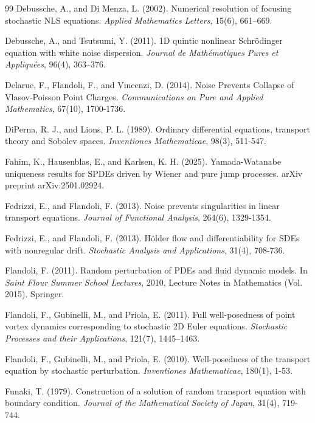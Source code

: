 \documentclass[12pt,oneside, reqno]{amsart}
\numberwithin{equation}{section}
\begin{document}
\begin{thebibliography}{99}
	 Debussche, A., and Di Menza, L. (2002). Numerical resolution of focusing stochastic NLS equations. {\it Applied Mathematics Letters}, 15(6), 661–669.
	
	 Debussche, A., and Tsutsumi, Y. (2011). 1D quintic nonlinear Schr\"{o}dinger equation with white noise dispersion. {\it Journal de Mathématiques Pures et Appliqu\'{e}es}, 96(4), 363–376.
	
	 Delarue, F., Flandoli, F., and Vincenzi, D. (2014). Noise Prevents Collapse of Vlasov‐Poisson Point Charges. {\it Communications on Pure and Applied Mathematics}, 67(10), 1700-1736.
	
	 DiPerna, R. J., and Lions, P. L. (1989). Ordinary differential equations, transport theory and Sobolev spaces. {\it Inventiones Mathematicae}, 98(3), 511-547.
	
	 Fahim, K., Hausenblas, E., and Karlsen, K. H. (2025). Yamada-Watanabe uniqueness results for SPDEs driven by Wiener and pure jump processes. arXiv preprint arXiv:2501.02924.
	
	 Fedrizzi, E., and Flandoli, F. (2013). Noise prevents singularities in linear transport equations. {\it Journal of Functional Analysis}, 264(6), 1329-1354.
	
	 Fedrizzi, E., and Flandoli, F. (2013). H\"{o}lder flow and differentiability for SDEs with nonregular drift. {\it Stochastic Analysis and Applications}, 31(4), 708-736.
	
	 Flandoli, F. (2011). Random perturbation of PDEs and fluid dynamic models. In {\it Saint Flour Summer School Lectures}, 2010, Lecture Notes in Mathematics (Vol. 2015). Springer.
	
	 Flandoli, F., Gubinelli, M., and Priola, E. (2011). Full well-posedness of point vortex dynamics corresponding to stochastic 2D Euler equations. {\it Stochastic Processes and their Applications}, 121(7), 1445–1463.
	
	 Flandoli, F., Gubinelli, M., and Priola, E. (2010). Well-posedness of the transport equation by stochastic perturbation. {\it Inventiones Mathematicae}, 180(1), 1-53.
	
	 Funaki, T. (1979). Construction of a solution of random transport equation with boundary condition. {\it Journal of the Mathematical Society of Japan}, 31(4), 719-744.
	

\end{thebibliography}
\end{document}
